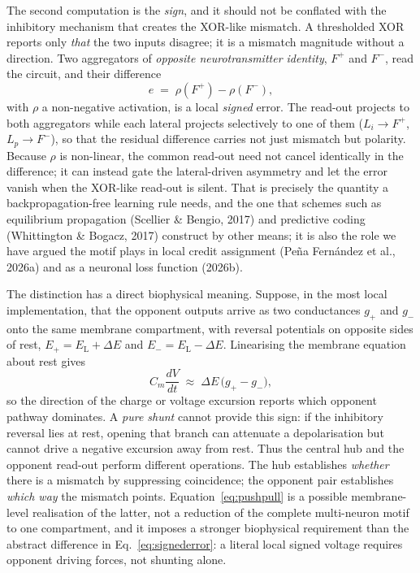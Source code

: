 \documentclass[11pt,a4paper]{article}
\begin{document}
The second computation is the \emph{sign}, and it should not be conflated with the inhibitory mechanism that creates the XOR-like mismatch. A thresholded XOR reports only \emph{that} the two inputs disagree; it is a mismatch magnitude without a direction. Two aggregators of \emph{opposite neurotransmitter identity}, $F^{+}$ and $F^{-}$, read the circuit, and their difference
\begin{equation}
e \;=\; \rho(F^{+}) - \rho(F^{-}),
\label{eq:signederror}
\end{equation}
with $\rho$ a non-negative activation, is a local \emph{signed} error. The read-out projects to both aggregators while each lateral projects selectively to one of them ($L_i\!\to\!F^{+}$, $L_p\!\to\!F^{-}$), so that the residual difference carries not just mismatch but polarity. Because $\rho$ is non-linear, the common read-out need not cancel identically in the difference; it can instead gate the lateral-driven asymmetry and let the error vanish when the XOR-like read-out is silent. That is precisely the quantity a backpropagation-free learning rule needs, and the one that schemes such as equilibrium propagation (Scellier \& Bengio, 2017) and predictive coding (Whittington \& Bogacz, 2017) construct by other means; it is also the role we have argued the motif plays in local credit assignment (Pe\~na Fern\'andez et al., 2026a) and as a neuronal loss function (2026b).

The distinction has a direct biophysical meaning. Suppose, in the most local implementation, that the opponent outputs arrive as two conductances $g_{+}$ and $g_{-}$ onto the same membrane compartment, with reversal potentials on opposite sides of rest, $E_{+}=E_{\mathrm{L}}+\Delta E$ and $E_{-}=E_{\mathrm{L}}-\Delta E$. Linearising the membrane equation about rest gives
\begin{equation}
C_m\frac{dV}{dt} \;\approx\; \Delta E\,\big(g_{+}-g_{-}\big),
\label{eq:pushpull}
\end{equation}
so the direction of the charge or voltage excursion reports which opponent pathway dominates. A \emph{pure shunt} cannot provide this sign: if the inhibitory reversal lies at rest, opening that branch can attenuate a depolarisation but cannot drive a negative excursion away from rest. Thus the central hub and the opponent read-out perform different operations. The hub establishes \emph{whether} there is a mismatch by suppressing coincidence; the opponent pair establishes \emph{which way} the mismatch points. Equation~\eqref{eq:pushpull} is a possible membrane-level realisation of the latter, not a reduction of the complete multi-neuron motif to one compartment, and it imposes a stronger biophysical requirement than the abstract difference in Eq.~\eqref{eq:signederror}: a literal local signed voltage requires opponent driving forces, not shunting alone.
\end{document}
